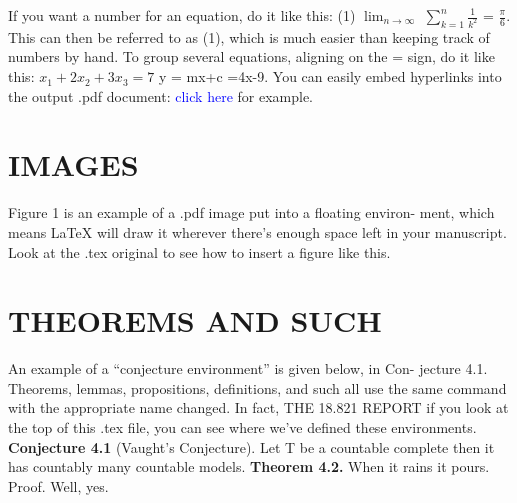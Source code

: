 \documentclass{article}
\begin{document}
           \large{If you want a number for an equation, do it like this: \newline 
           	(1)      $\lim_{n\to\infty}$ $\sum_{k=1}^{n}$$\frac{1}{k^2}$ = $\frac{\pi}{6}$.\newline
           	This can then be referred to as (1), which is much easier than keeping \newline
           	track of numbers by hand. To group several equations, aligning on the \newline
           	= sign, do it like this: \newline
           	 $x_1+2x_2+3x_3 = 7$ \newline
           	          y = mx+c \newline
           	            =4x-9. \newline
           	    You can easily embed hyperlinks into the output .pdf document: \newline
           	            \textcolor{blue}{click here }for example.
 \section{IMAGES} 
\large{Figure 1 is an example of a .pdf image put into a ﬂoating environ- \newline
 ment, which means LaTeX will draw it wherever there’s enough space 
 left in your manuscript. Look at the .tex original to see how to insert 
 a ﬁgure like this.}
\section{THEOREMS AND SUCH}
\large{An example of a “conjecture environment” is given below, in Con- \newline
jecture 4.1. Theorems, lemmas, propositions, deﬁnitions, and such \newline all 
use the same command with the appropriate name changed. In fact,\newline
       THE 18.821 REPORT \newline
if you look at the top of this .tex ﬁle, you can see where we’ve deﬁned 
these environments.\newline
\textbf{Conjecture 4.1} (Vaught’s Conjecture). Let T be a countable com­plete 
then it has countably many countable models. \newline
\textbf{Theorem 4.2.} When it rains it pours.
Proof. Well, yes.}

}
\end{document}
